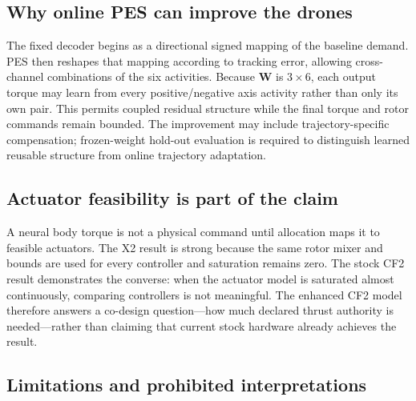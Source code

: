 \documentclass[10pt,twocolumn]{article}
\begin{document}
\subsection{Why online PES can improve the drones}

The fixed decoder begins as a directional signed mapping of the baseline
demand. PES then reshapes that mapping according to tracking error, allowing
cross-channel combinations of the six activities. Because $\bm W$ is
$3\times6$, each output torque may learn from every positive/negative axis
activity rather than only its own pair. This permits coupled residual structure
while the final torque and rotor commands remain bounded. The improvement may
include trajectory-specific compensation; frozen-weight hold-out evaluation is
required to distinguish learned reusable structure from online trajectory
adaptation.

\subsection{Actuator feasibility is part of the claim}

A neural body torque is not a physical command until allocation maps it to
feasible actuators. The X2 result is strong because the same rotor mixer and
bounds are used for every controller and saturation remains zero. The stock CF2
result demonstrates the converse: when the actuator model is saturated almost
continuously, comparing controllers is not meaningful. The enhanced CF2 model
therefore answers a co-design question---how much declared thrust authority is
needed---rather than claiming that current stock hardware already achieves the
result.

\subsection{Limitations and prohibited interpretations}
\end{document}
